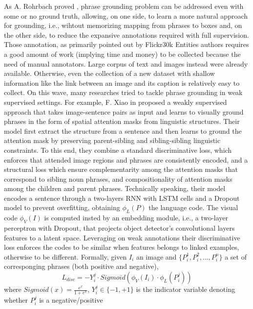 As A. Rohrbach \etal{} proved \cite{rohrbach2016grounding}, phrase
grounding problem can be addressed even with some or no ground truth,
allowing, on one side, to learn a more natural approach for grounding,
i.e., wihtout memorizing mapping from phrases to boxes and, on the
other side, to reduce the expansive annotations required with full
supervision. Those annotation, as primarily pointed out by Flickr30k
Entities authors \cite{plummer2015flickr30k} requires a good amount of
work (implying time and money) to be collected because the need of
manual annotators. Large corpus of text and images instead were
already available. Otherwise, even the collection of a new dataset
with shallow information like the link between an image and its
caption is relatively easy to collect. On this wave, many researches
tried to tackle phrase grounding in weak supervised settings.  For
example, F. Xiao \etal{} in \cite{xiao2017weakly} proposed a weakly
supervised approach that takes image-sentence pairs as input and
learns to visually ground phrases in the form of spatial attention
masks from linguistic structures. Their model first extract the
structure from a sentence and then learns to ground the attention mask
by preserving parent-sibling and sibling-sibling linguistic
constraints. To this end, they combine a standard discriminative loss,
which enforces that attended image regions and phrases are
consistently encoded, and a structural loss which ensure
complementarity among the attention masks that correspond to sibling
noun phrases, and compositionality of attention masks among the
children and parent phrases. Technically speaking, their model encodes
a sentence through a two-layers RNN with LSTM cells and a Dropout
model to prevent overfitting, obtaining $\phi_L(P)$ the language code.
The visual code $\phi_V(I)$ is computed insted by an embedding module,
i.e., a two-layer perceptron with Dropout, that projects object
detector's convolutional layers features to a latent space. Leveraging
on weak annotations their discriminative loss enforces the codes to be
similar when features belongs to linked examples, otherwise to be
different. Formally, given $I_i$ an image and $\{ P^1_i, P^2_i,
\ldots, P^n_i \}$ a set of corresponging phrases (both positive and
negative), 
\begin{equation}
  L_{disc} = -Y^j_i \cdot Sigmoid(\phi_V(I_i) \cdot \phi_L(P^j_i))
\end{equation}
where $Sigmoid(x) = \frac{e^x}{1 + e^x}$, $Y^j_i \in \{ -1, +1 \}$ is
the indicator variable denoting whether $P^j_i$ is a negative/positive
